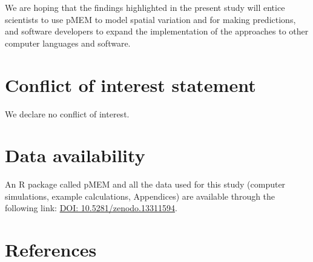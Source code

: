 \documentclass[
]{article}
\begin{document}
We are hoping that the findings highlighted in the present study will
entice scientists to use pMEM to model spatial variation and for making
predictions, and software developers to expand the implementation of the
approaches to other computer languages and software.

\section{Conflict of interest
statement}\label{conflict-of-interest-statement}

We declare no conflict of interest.

\section{Data availability}\label{data-availability}

An R package called pMEM and all the data used for this study (computer
simulations, example calculations, Appendices) are available through the
following link: \href{https://doi.org/10.5281/zenodo.13311594}{DOI:
10.5281/zenodo.13311594}.

\pagebreak

\section{References}\label{references}
\end{document}
